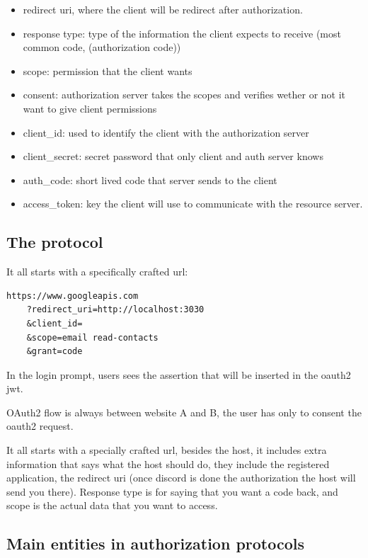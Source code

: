 \documentclass[11pt]{style}
\begin{document}
\begin{itemize}
    \item  redirect uri, where the client will be redirect after authorization.
    \item  response type: type of the information the client expects to receive
        (most common code, (authorization code))
    \item  scope: permission that the client wants
    \item  consent: authorization server takes the scopes and verifies wether or not
        it want to give client permissions
    \item  client\_id: used to identify the client with the authorization server
    \item  client\_secret: secret password that only client and auth server knows
    \item  auth\_code: short lived code that server sends to the client
    \item access\_token: key the client will use to communicate with the resource server.
\end{itemize}

\subsection{The protocol}
It all starts with a specifically crafted url:
\begin{lstlisting}
https://www.googleapis.com
    ?redirect_uri=http://localhost:3030
    &client_id=
    &scope=email read-contacts
    &grant=code
\end{lstlisting}

In the login prompt, users sees the assertion that will be inserted in the
oauth2 jwt.

OAuth2 flow is always between website A and B, the user has only to consent the
oauth2 request.

It all starts with a specially crafted url, besides the host, it includes extra
information that says what the host should do, they include the registered
application, the redirect uri (once discord is done the authorization the host
will send you there). Response type is for saying that you want a code back, and
scope is the actual data that you want to access.


\subsection{Main entities in authorization protocols}
\end{document}

